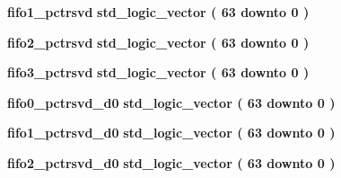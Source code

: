 \begin{DoxyCompactItemize}
\item 
{\bf fifo1\+\_\+pctrsvd} {\bfseries \textcolor{comment}{std\+\_\+logic\+\_\+vector}\textcolor{vhdlchar}{ }\textcolor{vhdlchar}{(}\textcolor{vhdlchar}{ }\textcolor{vhdlchar}{ } \textcolor{vhdldigit}{63} \textcolor{vhdlchar}{ }\textcolor{keywordflow}{downto}\textcolor{vhdlchar}{ }\textcolor{vhdlchar}{ } \textcolor{vhdldigit}{0} \textcolor{vhdlchar}{ }\textcolor{vhdlchar}{)}\textcolor{vhdlchar}{ }} 
\item 
{\bf fifo2\+\_\+pctrsvd} {\bfseries \textcolor{comment}{std\+\_\+logic\+\_\+vector}\textcolor{vhdlchar}{ }\textcolor{vhdlchar}{(}\textcolor{vhdlchar}{ }\textcolor{vhdlchar}{ } \textcolor{vhdldigit}{63} \textcolor{vhdlchar}{ }\textcolor{keywordflow}{downto}\textcolor{vhdlchar}{ }\textcolor{vhdlchar}{ } \textcolor{vhdldigit}{0} \textcolor{vhdlchar}{ }\textcolor{vhdlchar}{)}\textcolor{vhdlchar}{ }} 
\item 
{\bf fifo3\+\_\+pctrsvd} {\bfseries \textcolor{comment}{std\+\_\+logic\+\_\+vector}\textcolor{vhdlchar}{ }\textcolor{vhdlchar}{(}\textcolor{vhdlchar}{ }\textcolor{vhdlchar}{ } \textcolor{vhdldigit}{63} \textcolor{vhdlchar}{ }\textcolor{keywordflow}{downto}\textcolor{vhdlchar}{ }\textcolor{vhdlchar}{ } \textcolor{vhdldigit}{0} \textcolor{vhdlchar}{ }\textcolor{vhdlchar}{)}\textcolor{vhdlchar}{ }} 
\item 
{\bf fifo0\+\_\+pctrsvd\+\_\+d0} {\bfseries \textcolor{comment}{std\+\_\+logic\+\_\+vector}\textcolor{vhdlchar}{ }\textcolor{vhdlchar}{(}\textcolor{vhdlchar}{ }\textcolor{vhdlchar}{ } \textcolor{vhdldigit}{63} \textcolor{vhdlchar}{ }\textcolor{keywordflow}{downto}\textcolor{vhdlchar}{ }\textcolor{vhdlchar}{ } \textcolor{vhdldigit}{0} \textcolor{vhdlchar}{ }\textcolor{vhdlchar}{)}\textcolor{vhdlchar}{ }} 
\item 
{\bf fifo1\+\_\+pctrsvd\+\_\+d0} {\bfseries \textcolor{comment}{std\+\_\+logic\+\_\+vector}\textcolor{vhdlchar}{ }\textcolor{vhdlchar}{(}\textcolor{vhdlchar}{ }\textcolor{vhdlchar}{ } \textcolor{vhdldigit}{63} \textcolor{vhdlchar}{ }\textcolor{keywordflow}{downto}\textcolor{vhdlchar}{ }\textcolor{vhdlchar}{ } \textcolor{vhdldigit}{0} \textcolor{vhdlchar}{ }\textcolor{vhdlchar}{)}\textcolor{vhdlchar}{ }} 
\item 
{\bf fifo2\+\_\+pctrsvd\+\_\+d0} {\bfseries \textcolor{comment}{std\+\_\+logic\+\_\+vector}\textcolor{vhdlchar}{ }\textcolor{vhdlchar}{(}\textcolor{vhdlchar}{ }\textcolor{vhdlchar}{ } \textcolor{vhdldigit}{63} \textcolor{vhdlchar}{ }\textcolor{keywordflow}{downto}\textcolor{vhdlchar}{ }\textcolor{vhdlchar}{ } \textcolor{vhdldigit}{0} \textcolor{vhdlchar}{ }\textcolor{vhdlchar}{)}\textcolor{vhdlchar}{ }} 

\end{DoxyCompactItemize}
